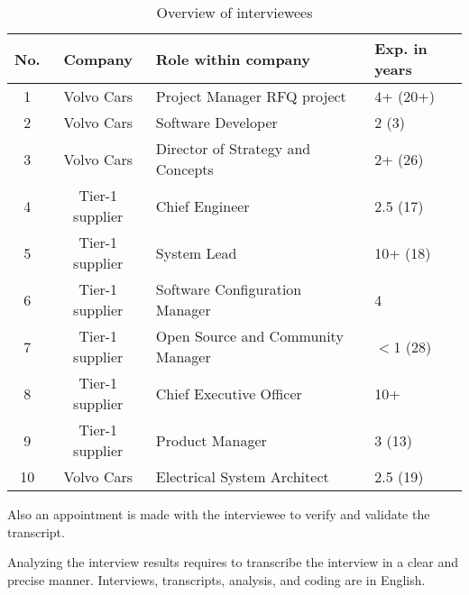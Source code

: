  \begin{table}[htb]
 \centering \small
 \begin{tabular}{|c|c|p{3cm}|l|}\hline
 {\bf No.} & {\bf Company} & {\bf Role within company} & {\bf Exp. in years}\\ \hline
 1 & Volvo Cars & Project Manager RFQ project & 4+ (20+) \\ \hline
 2 & Volvo Cars & Software Developer & 2 (3)\\ \hline
 3 & Volvo Cars & Director of Strategy and Concepts & 2+ (26) \\ \hline
 4 & Tier-1 supplier & Chief Engineer & 2.5 (17)\\ \hline
 5 & Tier-1 supplier & System Lead & 10+ (18) \\ \hline
 6 & Tier-1 supplier & Software Configuration Manager & 4\\ \hline
 7 & Tier-1 supplier & Open Source and Community Manager & $<$1 (28)\\ \hline
 8 & Tier-1 supplier & Chief Executive Officer & 10+\\ \hline
 9 & Tier-1 supplier & Product Manager & 3 (13)\\ \hline
 10 & Volvo Cars & Electrical System Architect & 2.5 (19)\\ \hline
 \end{tabular}
 \caption{Overview of interviewees}
 \label{tab:population}
 \vspace{-.4cm}
 \end{table}

Also an appointment is made with the interviewee to verify and validate the transcript.

 Analyzing the interview results requires to transcribe the interview in a clear and precise manner. %
{%
Interviews, transcripts, analysis, and coding are in English.} 

